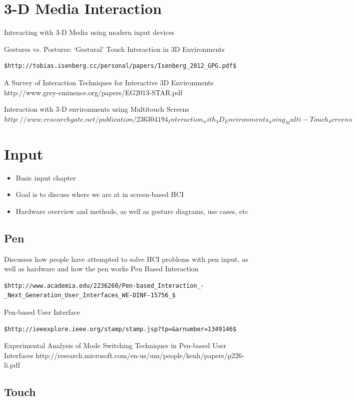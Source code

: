\documentclass[12pt]{report}
\begin{document}
\pagebreak

\section{3-D Media Interaction}

Interacting with 3-D Media using modern input devices

Gestures vs. Postures: ‘Gestural’ Touch Interaction in 3D Environments 

\begin{verbatim}
$http://tobias.isenberg.cc/personal/papers/Isenberg_2012_GPG.pdf$
\end{verbatim}
A Survey of Interaction Techniques for Interactive 3D Environments http://www.grey-eminence.org/papers/EG2013-STAR.pdf

Interaction with 3-D environments using Multitouch Screens $http://www.researchgate.net/publication/236304194_Interaction_with_3D_Environments_using_Multi-Touch_Screens$

\pagebreak
\section{Input}

\begin{itemize}
\item Basic input chapter
\item Goal is to discuss where we are at in screen-based HCI
\item Hardware overview and methods, as well as gesture diagrams, use cases, etc
\end{itemize}
\subsection{Pen}

Discusses how people have attempted to solve HCI problems with pen input, as well as hardware and how the pen works 
Pen Based Interaction 
\begin{verbatim}
$http://www.academia.edu/2236260/Pen-based_Interaction_-_Next_Generation_User_Interfaces_WE-DINF-15756_$
\end{verbatim}
Pen-based User Interface 
\begin{verbatim}
$http://ieeexplore.ieee.org/stamp/stamp.jsp?tp=&arnumber=1349146$
\end{verbatim}
Experimental Analysis of Mode Switching Techniques in Pen-based User Interfaces http://research.microsoft.com/en-us/um/people/kenh/papers/p226-li.pdf
\subsection{Touch}
\end{document}
